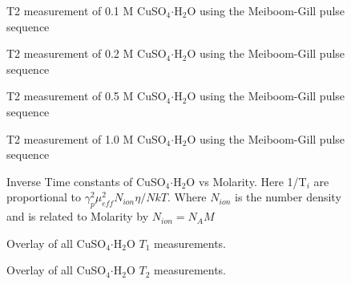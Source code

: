 \documentclass[
reprint,
amsmath,amssymb,
aps,
tikz,
border=5pt
]{revtex4-1}
\newcommand*{\cuso}[1][]{CuSO$_{4} \boldsymbol{\cdot} $H$_2$O }
\newcommand*{\tc}[1][1]{$T_#1$ }
\newcommand*{\tg}[1][2]{$T_#1$ }
\begin{document}
\begin{figure}[h]
  \resizebox{0.75\textwidth}{!}{}
  \caption{T2 measurement of 0.1 M CuSO$_{4} \boldsymbol{\cdot} $H$_2$O using the Meiboom-Gill pulse sequence }
  \label{figAp:0d1_t2}
\end{figure}

\begin{figure}[h]
  \resizebox{0.75\textwidth}{!}{}
  \caption{T2 measurement of 0.2 M CuSO$_{4} \boldsymbol{\cdot} $H$_2$O using the Meiboom-Gill pulse sequence }
  \label{figAp:0d2_t2}
\end{figure}

\begin{figure}[h]
  \resizebox{0.75\textwidth}{!}{}
  \caption{T2 measurement of 0.5 M CuSO$_{4} \boldsymbol{\cdot} $H$_2$O using the Meiboom-Gill pulse sequence }
  \label{figAp:0d5_t2}
\end{figure}

\begin{figure}[h]
  \resizebox{0.75\textwidth}{!}{}
  \caption{T2 measurement of 1.0 M CuSO$_{4} \boldsymbol{\cdot} $H$_2$O using the Meiboom-Gill pulse sequence }
  \label{figAp:1d0_t2}
\end{figure}



\begin{figure}[h]
  \resizebox{0.75\textwidth}{!}{}
  \caption{Inverse Time constants of CuSO$_{4} \boldsymbol{\cdot} $H$_2$O vs Molarity. Here 1/T$_i$ are proportional to $\gamma^2_p \mu^2_{eff} N_{ion} \eta / NkT$. Where $N_{ion}$ is the number density and is related to Molarity by $N_{ion} = N_A M$ }
  \label{figAp:cu_linear}
\end{figure}


\begin{figure}[h]
\resizebox{0.75\textwidth}{!}{}
\caption{Overlay of all \cuso \tc measurements. }
\label{figAp:sumt2}
\end{figure}


\begin{figure}[h]
\resizebox{0.75\textwidth}{!}{}
\caption{Overlay of all \cuso \tg measurements. }
\label{figAp:sumt2}
\end{figure}
\end{document}
